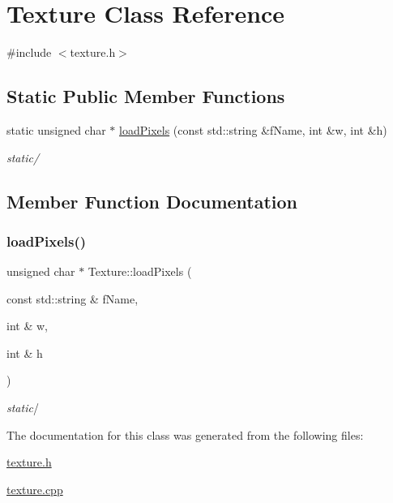\hypertarget{class_texture}{}\section{Texture Class Reference}
\label{class_texture}


{\ttfamily \#include $<$texture.\+h$>$}

\subsection*{Static Public Member Functions}
\begin{DoxyCompactItemize}
\item 
static unsigned char $\ast$ \mbox{\hyperlink{class_texture_ab9dca42ddbcfe94de0fb6d642697bb8d}{load\+Pixels}} (const std\+::string \&f\+Name, int \&w, int \&h)
\begin{DoxyCompactList}\small\item\em {\itshape static}/ \end{DoxyCompactList}\end{DoxyCompactItemize}


\subsection{Member Function Documentation}
\mbox{\label{class_texture_ab9dca42ddbcfe94de0fb6d642697bb8d}} 
\subsubsection{\texorpdfstring{loadPixels()}{loadPixels()}}
{\footnotesize\ttfamily unsigned char $\ast$ Texture\+::load\+Pixels (\begin{DoxyParamCaption}\item[{const std\+::string \&}]{f\+Name,  }\item[{int \&}]{w,  }\item[{int \&}]{h }\end{DoxyParamCaption})\hspace{0.3cm}{\ttfamily [static]}}



{\itshape static}/ 



The documentation for this class was generated from the following files\+:\begin{DoxyCompactItemize}
\item 
\mbox{\hyperlink{texture_8h}{texture.\+h}}\item 
\mbox{\hyperlink{texture_8cpp}{texture.\+cpp}}\end{DoxyCompactItemize}
